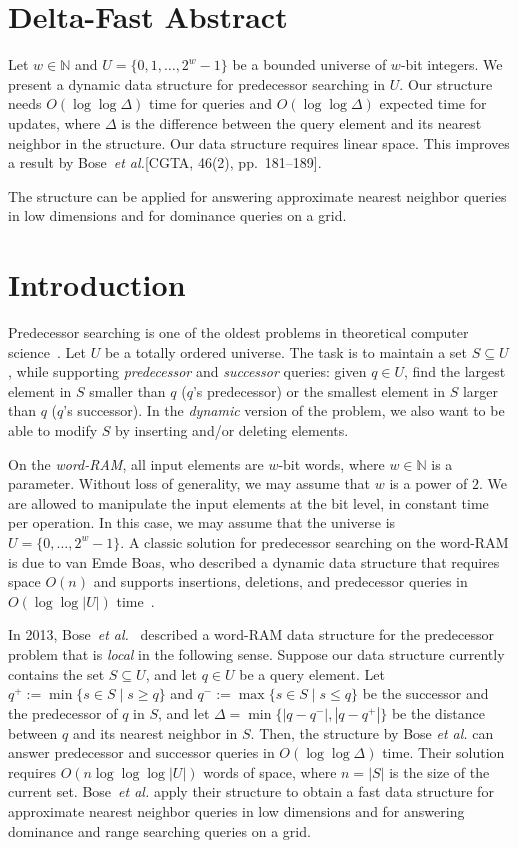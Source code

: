 \documentclass[a4paper,11pt]{article}
\newcommand{\N}{\mathbb{N}}
\newcommand{\etal}{\emph{et al.}\xspace}
\newcommand{\?}{\mskip1.5mu}
\begin{document}
\section{Delta-Fast Abstract}
Let $w \in \N$ and $U = \{0, 1, \dots, 2^w-1\}$ be a 
bounded universe of $w$-bit integers.  We present a 
dynamic data structure for predecessor searching in 
$U$.  Our structure needs $O(\log \log \Delta)$ time 
for queries and $O(\log \log \Delta)$ expected time 
for updates, where $\Delta$ is the difference between 
the query element and its nearest neighbor in the 
structure. Our data structure requires linear space. 
This improves a result by Bose~\etal [CGTA, 46(2), pp.~181--189].

The structure can be applied for answering approximate nearest
neighbor queries in low dimensions and for dominance queries on
a grid.

\section{Introduction}

Predecessor searching is one of the oldest problems in 
theoretical computer science~\cite{CormenLeRiSt09,Knuth98}.
Let $U$ be a totally ordered universe. The task
is to maintain a set $S \subseteq U$,
while supporting
\emph{predecessor} and \emph{successor} queries: 
given $q \in U$, find the largest element in $S$ 
smaller than $q$ ($q$'s predecessor) or the 
smallest element in $S$ larger than $q$
($q$'s successor). In the \emph{dynamic}
version of the problem, we also want to 
be able to modify $S$ by inserting and/or 
deleting elements.

On the \emph{word-RAM},
all input elements are $w$-bit words, where
$w \in \N$ is a parameter. Without loss of 
generality, we may assume that $w$ is a power 
of $2$. We are allowed to manipulate the input 
elements at the bit level, in constant time per 
operation. In this case, we may assume that the 
universe is $U = \{0, \dots, 2^{w}-1\}$. 
A classic solution for predecessor searching on the
word-RAM is due to van Emde Boas, who
described a dynamic data structure that
requires space $O(n)$ and supports insertions,
deletions, and predecessor queries in $O(\log\log |U|)$ 
time~\cite{vEmdeBoas77,vEmdeBoasKaZi76}.

In 2013, Bose~\etal~\cite{BoseDoDuHoMo13} described
a word-RAM data structure for the predecessor
problem that is \emph{local} in the following sense.
Suppose our data structure currently contains the
set $S \subseteq U$, and let $q \in U$ be a query
element.  Let $q^+ := \min\{s \in S \mid s \geq q \}$ and
$q^- := \max\{s \in S \mid s \leq q \}$ be the 
successor and the predecessor of $q$ in $S$, and let
$\Delta= \min\{|q- q^-|, |q-q^+|\}$ be the distance
between $q$ and its nearest neighbor in $S$. Then, 
the structure by Bose \etal can answer predecessor 
and successor queries in $O(\log\log \Delta)$ time.
Their solution requires $O(n \log\log\log|U|)$ words 
of space, where $n = |S|$ is the size of the 
current set. Bose~\etal apply their structure 
to obtain a fast data structure for approximate nearest 
neighbor queries in low dimensions and for answering
dominance and range searching queries on a grid.
\end{document}
